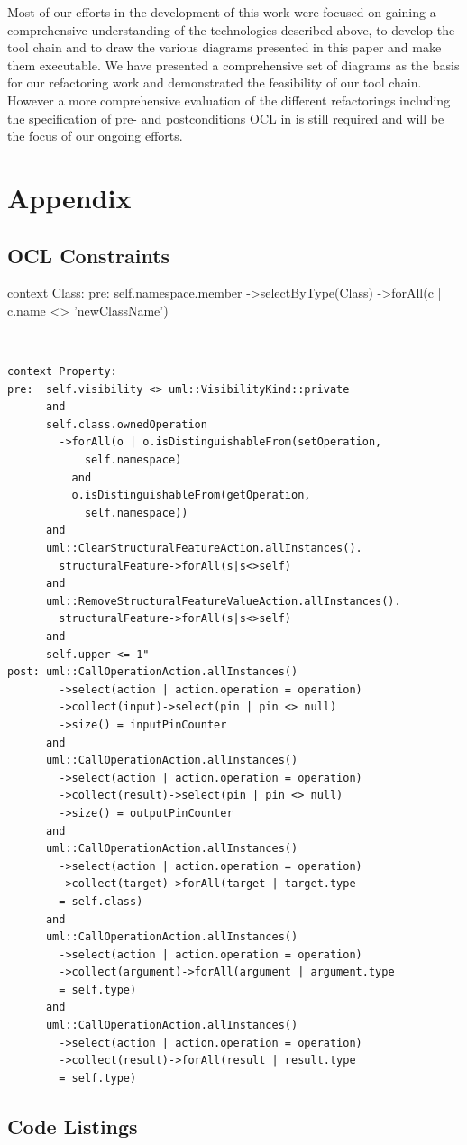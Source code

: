 \documentclass{llncs}
\begin{document}
Most of our efforts in the development of this work were focused on gaining a comprehensive understanding of the
technologies described above, to develop the tool chain and to draw the various diagrams presented in this paper and make 
them executable. We have presented a comprehensive set of diagrams as the basis for our refactoring work and demonstrated 
the feasibility of our tool chain. However a more comprehensive evaluation of the different refactorings including the 
specification of pre- and postconditions OCL in is still required and will be the focus of our ongoing efforts.

\newpage



\newpage
\appendix
\section{Appendix}
\label{sec:appendix}

\subsection{OCL Constraints}
\label{sec:appconstraints}

\begin{lstsingle}[language=OCL,caption=OCL for \textit{rename class} refactoring,label=lst:renameclass]
context Class:
pre:  self.namespace.member
      ->selectByType(Class)
      ->forAll(c | c.name <> 'newClassName')
\end{lstsingle}
\\
\begin{lstlisting}[language=OCL,caption=OCL for \textit{encapsulate property} refactoring,label=lst:encapsulate]
context Property:
pre:  self.visibility <> uml::VisibilityKind::private 
      and 
      self.class.ownedOperation
        ->forAll(o | o.isDistinguishableFrom(setOperation, 
            self.namespace)
          and 
          o.isDistinguishableFrom(getOperation, 
            self.namespace)) 
      and 
      uml::ClearStructuralFeatureAction.allInstances().
        structuralFeature->forAll(s|s<>self)
      and
      uml::RemoveStructuralFeatureValueAction.allInstances().
        structuralFeature->forAll(s|s<>self)
      and
      self.upper <= 1"
post: uml::CallOperationAction.allInstances()
        ->select(action | action.operation = operation)
        ->collect(input)->select(pin | pin <> null)
        ->size() = inputPinCounter
      and
      uml::CallOperationAction.allInstances()
        ->select(action | action.operation = operation)
        ->collect(result)->select(pin | pin <> null)
        ->size() = outputPinCounter
      and
      uml::CallOperationAction.allInstances()
        ->select(action | action.operation = operation)
        ->collect(target)->forAll(target | target.type 
        = self.class)
      and 
      uml::CallOperationAction.allInstances()
        ->select(action | action.operation = operation)
        ->collect(argument)->forAll(argument | argument.type 
        = self.type)
      and
      uml::CallOperationAction.allInstances()
        ->select(action | action.operation = operation)
        ->collect(result)->forAll(result | result.type 
        = self.type)
\end{lstlisting}

\subsection{Code Listings}
\label{sec:applistings}
\end{document}

